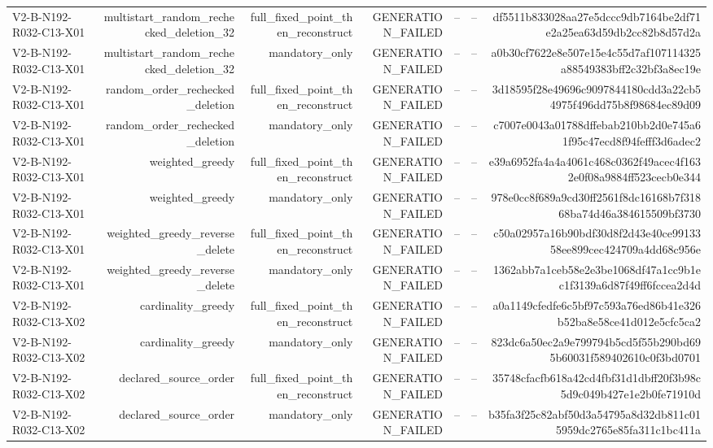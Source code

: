 {\begin{longtable}{lrrrrrr}
V2-B-N192-R032-C13-X01 & multistart\_random\_rechecked\_deletion\_32 & full\_fixed\_point\_then\_reconstruct & GENERATION\_FAILED & -- & -- & df5511b833028aa27e5dccc9db7164be2df71e2a25ea63d59db2cc82b8d57d2a \\
V2-B-N192-R032-C13-X01 & multistart\_random\_rechecked\_deletion\_32 & mandatory\_only & GENERATION\_FAILED & -- & -- & a0b30cf7622e8e507e15e4c55d7af107114325a88549383bff2c32bf3a8ec19e \\
V2-B-N192-R032-C13-X01 & random\_order\_rechecked\_deletion & full\_fixed\_point\_then\_reconstruct & GENERATION\_FAILED & -- & -- & 3d18595f28e49696c9097844180cdd3a22cb54975f496dd75b8f98684ec89d09 \\
V2-B-N192-R032-C13-X01 & random\_order\_rechecked\_deletion & mandatory\_only & GENERATION\_FAILED & -- & -- & c7007e0043a01788dffebab210bb2d0e745a61f95c47ecd8f94fefff3d6adec2 \\
V2-B-N192-R032-C13-X01 & weighted\_greedy & full\_fixed\_point\_then\_reconstruct & GENERATION\_FAILED & -- & -- & e39a6952fa4a4a4061c468c0362f49acec4f1632e0f08a9884ff523cecb0e344 \\
V2-B-N192-R032-C13-X01 & weighted\_greedy & mandatory\_only & GENERATION\_FAILED & -- & -- & 978e0cc8f689a9cd30ff2561f8dc16168b7f31868ba74d46a384615509bf3730 \\
V2-B-N192-R032-C13-X01 & weighted\_greedy\_reverse\_delete & full\_fixed\_point\_then\_reconstruct & GENERATION\_FAILED & -- & -- & c50a02957a16b90bdf30d8f2d43e40ce9913358ee899cec424709a4dd68c956e \\
V2-B-N192-R032-C13-X01 & weighted\_greedy\_reverse\_delete & mandatory\_only & GENERATION\_FAILED & -- & -- & 1362abb7a1ceb58e2e3be1068df47a1cc9b1ec1f3139a6d87f49ff6fccea2d4d \\
V2-B-N192-R032-C13-X02 & cardinality\_greedy & full\_fixed\_point\_then\_reconstruct & GENERATION\_FAILED & -- & -- & a0a1149cfedfe6c5bf97c593a76ed86b41e326b52ba8e58ce41d012e5cfc5ca2 \\
V2-B-N192-R032-C13-X02 & cardinality\_greedy & mandatory\_only & GENERATION\_FAILED & -- & -- & 823dc6a50ec2a9e799794b5cd5f55b290bd695b60031f589402610c0f3bd0701 \\
V2-B-N192-R032-C13-X02 & declared\_source\_order & full\_fixed\_point\_then\_reconstruct & GENERATION\_FAILED & -- & -- & 35748cfacfb618a42cd4fbf31d1dbff20f3b98c5d9c049b427e1e2b0fe71910d \\
V2-B-N192-R032-C13-X02 & declared\_source\_order & mandatory\_only & GENERATION\_FAILED & -- & -- & b35fa3f25c82abf50d3a54795a8d32db811c015959dc2765e85fa311c1bc411a \\

\end{longtable}}
